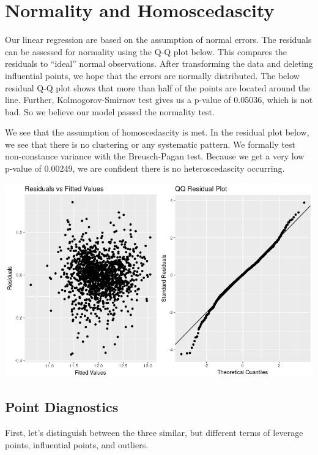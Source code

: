 \documentclass[12pt]{article}
\begin{document}
\begin{flushleft}
\section{Normality and Homoscedascity}
\begin{flushleft}

Our linear regression are based on the assumption of normal errors. The residuals can be assessed for normality using the Q-Q plot below. This compares the residuals to “ideal” normal observations. After transforming the data and deleting influential points, we hope that the errors are normally distributed.
The below residual Q-Q plot shows that more than half of the points are located around the line. Further, Kolmogorov-Smirnov test gives us a p-value of 0.05036, which is not bad. So we believe our model passed the normality test.

We see that the assumption of homoscedascity is met. In the residual plot below, we see that there is no clustering or any systematic pattern. We formally test non-constance variance with the Breusch-Pagan test. Because we get a very low p-value of 0.00249, we are confident there is no heteroscedascity occurring.
\end{flushleft}
\centering
    \vspace*{0.5 cm}
    \includegraphics[scale = .5]{res.png}\\[1.0 cm]	
\begin{flushleft}
\centering
\section{Point Diagnostics}
\begin{flushleft}
First, let's distinguish between the three similar, but different terms of leverage points, influential points, and outliers.
\end{flushleft}

\end{flushleft}
\end{flushleft}
\end{document}
